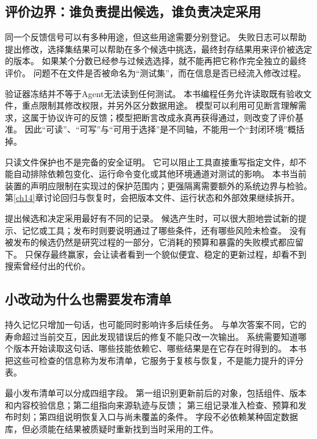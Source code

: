 \subsection{评价边界：谁负责提出候选，谁负责决定采用}

同一个反馈信号可以有多种用途，但这些用途需要分别登记。
失败日志可以帮助提出修改，选择集结果可以帮助在多个候选中挑选，最终封存结果用来评价被选定的版本。
如果某个分数已经参与过候选选择，就不能再把它称作完全独立的最终评价。
问题不在文件是否被命名为``测试集''，而在信息是否已经流入修改过程。

验证器冻结并不等于Agent无法读到任何测试。
本书编程任务允许读取既有验收文件，重点限制其修改权限，并另外区分数据用途。
模型可以利用可见断言理解需求，这属于协议许可的反馈；模型把断言改成永真再获得通过，则改变了评价基准。
因此``可读''、``可写''与``可用于选择''是不同轴，不能用一个``封闭环境''概括掉。

只读文件保护也不是完备的安全证明。
它可以阻止工具直接重写指定文件，却不能自动排除依赖包变化、运行命令变化或其他环境通道对测试的影响。
本书当前装置的声明应限制在实现过的保护范围内；更强隔离需要额外的系统边界与检验。
第\ref{ch14}章讨论回归与恢复时，会把版本文件、运行状态和外部效果继续拆开。

提出候选和决定采用最好有不同的记录。
候选产生时，可以很大胆地尝试新的提示、记忆或工具；发布时则要说明通过了哪些条件，还有哪些风险未检查。
没有被发布的候选仍然是研究过程的一部分，它消耗的预算和暴露的失败模式都应留下。
只保存最终赢家，会让读者看到一个貌似便宜、稳定的更新过程，却看不到搜索曾经付出的代价。

\subsection{小改动为什么也需要发布清单}

持久记忆只增加一句话，也可能同时影响许多后续任务。
与单次答案不同，它的寿命超过当前交互，因此发现错误后的修复不能只改一次输出。
系统需要知道哪个版本开始读取这句话、哪些技能依赖它、哪些结果是在它存在时得到的。
本书把这些可检查的信息称为发布清单，它服务于复核与恢复，不是能力提升的评分表。

最小发布清单可以分成四组字段。
第一组识别更新前后的对象，包括组件、版本和内容校验信息；第二组指向来源轨迹与反馈；
第三组记录准入检查、预算和发布时刻；第四组说明恢复入口与尚未覆盖的条件。
字段不必依赖某种固定数据库，但必须能在结果被质疑时重新找到当时采用的工件。

